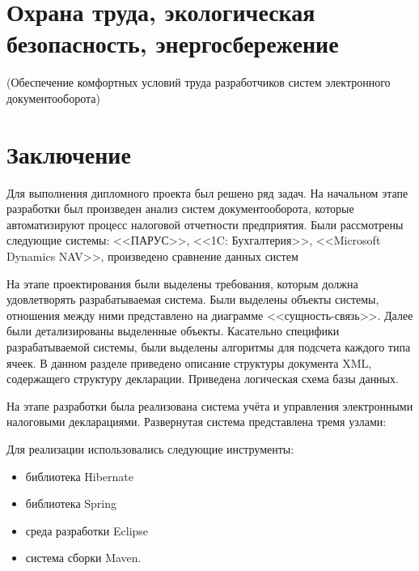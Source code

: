 \documentclass[14pt,a4paper]{reportmod}
\begin{document}
\chapter{Охрана труда, экологическая безопасность, энергосбережение}
(Обеспечение комфортных условий труда разработчиков систем электронного документооборота)

\chapter*{Заключение}
Для выполнения дипломного проекта был решено ряд задач. На начальном этапе разработки был произведен анализ систем документооборота, которые автоматизируют процесс налоговой отчетности предприятия. Были рассмотрены следующие системы: <<ПАРУС>>, <<1C: Бухгалтерия>>, <<Microsoft Dynamics NAV>>, произведено сравнение данных систем

На этапе проектирования были выделены требования, которым должна удовлетворять разрабатываемая система. Были выделены объекты системы, отношения между ними представлено на диаграмме <<сущность-связь>>. Далее были детализированы выделенные объекты. Касательно специфики разрабатываемой системы, были выделены алгоритмы для подсчета каждого типа ячеек. В данном разделе приведено описание структуры документа XML, содержащего структуру декларации. Приведена логическая схема базы данных.

На этапе разработки была реализована система учёта и управления электронными налоговыми декларациями. Развернутая система представлена тремя узлами:
\begin{gostitemize}
\end{gostitemize}

Для реализации использовались следующие инструменты:
\begin{itemize}
  \item библиотека Hibernate
  \item библиотека Spring
  \item среда разработки Eclipse
  \item система сборки Maven.
\end{itemize}
\end{document}
